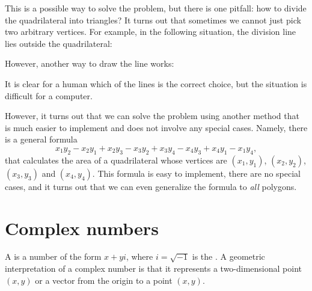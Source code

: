 This is a possible way to solve the problem,
but there is one pitfall:
how to divide the quadrilateral into triangles?
It turns out that sometimes we cannot just pick
two arbitrary vertices.
For example, in the following situation,
the division line lies outside the quadrilateral:
\begin{center}
\end{center}
However, another way to draw the line works:
\begin{center}
\end{center}
It is clear for a human which of the lines is the correct
choice, but the situation is difficult for a computer.
                           
However, it turns out that we can solve the problem using
another method that is much easier to implement
and does not involve any special cases.
Namely, there is a general formula
\[x_1y_2-x_2y_1+x_2y_3-x_3y_2+x_3y_4-x_4y_3+x_4y_1-x_1y_4,\]
that calculates the area of a quadrilateral
whose vertices are
$(x_1,y_1)$,
$(x_2,y_2)$,
$(x_3,y_3)$ and
$(x_4,y_4)$.
This formula is easy to implement, there are no special
cases, and it turns out that we can even generalize the formula
to \emph{all} polygons.

\section{Complex numbers}


A  is a number of the form $x+y i$,
where $i = \sqrt{-1}$ is the .
A geometric interpretation of a complex number is
that it represents a two-dimensional point $(x,y)$
or a vector from the origin to a point $(x,y)$.

